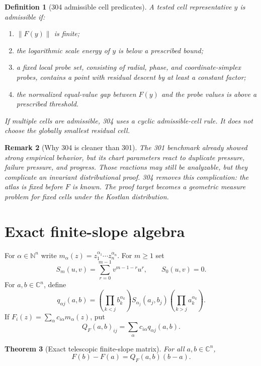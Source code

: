 \documentclass[11pt]{article}
\newtheorem{definition}{Definition}[section]
\newtheorem{theorem}[definition]{Theorem}
\newtheorem{remark}[definition]{Remark}
\newcommand{\C}{\mathbb C}
\newcommand{\N}{\mathbb N}
\newcommand{\norm}[1]{\left\lVert #1\right\rVert}
\begin{document}
\begin{definition}[304 admissible cell predicates]
A tested cell representative $y$ is admissible if:
\begin{enumerate}[label=(\roman*)]
\item $\norm{F(y)}$ is finite;
\item the logarithmic scale energy of $y$ is below a prescribed bound;
\item a fixed local probe set, consisting of radial, phase, and coordinate-simplex probes, contains a point with residual descent by at least a constant factor;
\item the normalized equal-value gap between $F(y)$ and the probe values is above a prescribed threshold.
\end{enumerate}
If multiple cells are admissible, 304 uses a cyclic admissible-cell rule.  It does not choose the globally smallest residual cell.
\end{definition}

\begin{remark}[Why 304 is cleaner than 301]
The 301 benchmark already showed strong empirical behavior, but its chart parameters react to duplicate pressure, failure pressure, and progress.  Those reactions may still be analyzable, but they complicate an invariant distributional proof.  304 removes this complication: the atlas is fixed before $F$ is known.  The proof target becomes a geometric measure problem for fixed cells under the Kostlan distribution.
\end{remark}

\section{Exact finite-slope algebra}

For $\alpha\in\N^n$ write $m_\alpha(z)=z_1^{\alpha_1}\cdots z_n^{\alpha_n}$.  For $m\ge1$ set
\[
        S_m(u,v)=\sum_{r=0}^{m-1}v^{m-1-r}u^r,\qquad S_0(u,v)=0.
\]
For $a,b\in\C^n$, define
\[
        q_{\alpha j}(a,b)=
        \left(\prod_{k<j}b_k^{\alpha_k}\right)
        S_{\alpha_j}(a_j,b_j)
        \left(\prod_{k>j}a_k^{\alpha_k}\right).
\]
If $F_i(z)=\sum_\alpha c_{i\alpha}m_\alpha(z)$, put
\[
        Q_F(a,b)_{ij}=\sum_\alpha c_{i\alpha}q_{\alpha j}(a,b).
\]

\begin{theorem}[Exact telescopic finite-slope matrix]\label{thm:telescopic}
For all $a,b\in\C^n$,
\[
        F(b)-F(a)=Q_F(a,b)(b-a).
\]
\end{theorem}
\end{document}
